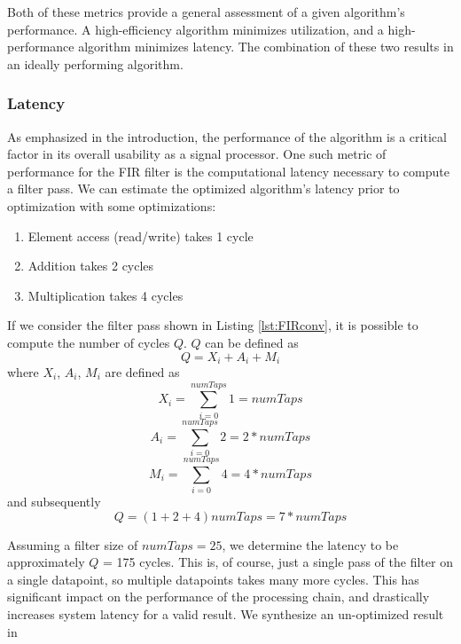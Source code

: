 \documentclass[11pt]{report}
\begin{document}
Both of these metrics provide a general assessment of a given algorithm's performance. A high-efficiency algorithm minimizes utilization, and a high-performance algorithm minimizes latency. The combination of these two results in an ideally performing algorithm.

\subsubsection{Latency}
As emphasized in the introduction, the performance of the algorithm is a critical factor in its overall usability as a signal processor. One such metric of performance for the FIR filter is the computational latency necessary to compute a filter pass. We can estimate the optimized algorithm's latency prior to optimization with some optimizations:
\begin{enumerate}
	\item Element access (read/write) takes 1 cycle
	\item Addition takes 2 cycles
	\item Multiplication takes 4 cycles
\end{enumerate}
If we consider the filter pass shown in Listing \ref{lst:FIRconv}, it is possible to compute the number of cycles $Q$. $Q$ can be defined as 
\begin{equation}
	Q = X_i + A_i + M_i
\end{equation}
where $X_i$, $A_i$, $M_i$ are defined as 
\begin{equation}
	X_i = \sum_{i=0}^{numTaps} 1 = numTaps
\end{equation}
\begin{equation}
	A_i = \sum_{i=0}^{numTaps} 2 = 2 * numTaps
\end{equation}
\begin{equation}
	M_i = \sum_{i=0}^{numTaps} 4 = 4 * numTaps
\end{equation}
and subsequently 
\begin{equation}
	Q = (1 + 2 + 4)numTaps = 7 * numTaps
\end{equation}
 
 Assuming a filter size of $numTaps = 25$, we determine the latency to be approximately $Q$ = 175 cycles. This is, of course, just a single pass of the filter on a single datapoint, so multiple datapoints takes many more cycles. This has significant impact on the performance of the processing chain, and drastically increases system latency for a valid result. We synthesize an un-optimized result in 
 
\end{document}
